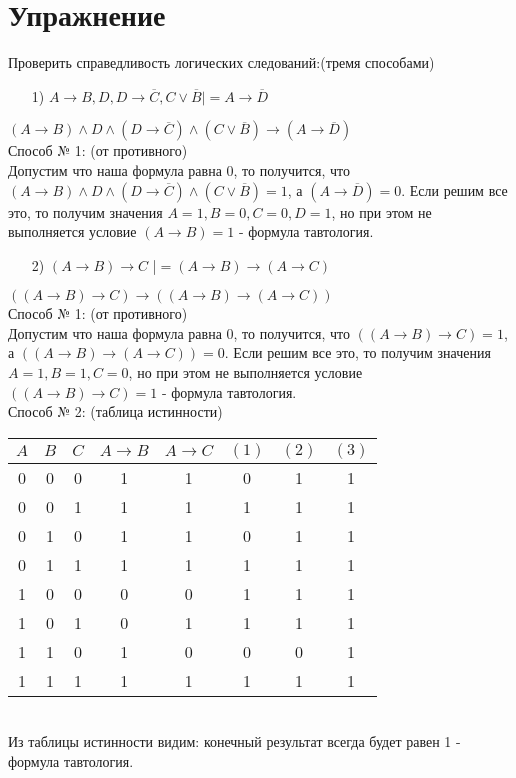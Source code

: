 \documentclass{article}
\begin{document}
\section{Упражнение}
Проверить справедливость логических следований:(тремя способами)
\begin{enumerate}
\item[1)] $A \rightarrow B,D , D \rightarrow \overline{C},C \vee \overline{B} |= A \rightarrow \overline{D}$
\end{enumerate}
$(A \rightarrow B) \wedge D \wedge (D \rightarrow \overline{C}) \wedge (C \vee \overline{B}) \rightarrow (A \rightarrow \overline{D})$\\
Способ № 1: (от противного)\\
Допустим что наша формула равна 0, то получится, что $(A \rightarrow B) \wedge D \wedge (D \rightarrow \overline{C}) \wedge (C \vee \overline{B}) = 1$, а $(A \rightarrow \overline{D}) = 0$. Если решим все это, то получим значения $A = 1, B = 0, C = 0, D = 1$, но при этом не выполняется условие $(A \rightarrow B) = 1$ - формула тавтология.\\

\begin{enumerate}
\item[2)] $(A \rightarrow B) \rightarrow C$ |$=(A \rightarrow B) \rightarrow (A \rightarrow C)$
\end{enumerate}
$((A \rightarrow B) \rightarrow C) \rightarrow ((A \rightarrow B) \rightarrow (A \rightarrow C))$\\
Способ № 1: (от противного)\\
Допустим что наша формула равна 0, то получится, что $((A \rightarrow B) \rightarrow C) = 1$, а $((A \rightarrow B) \rightarrow (A \rightarrow C)) = 0$. Если решим все это, то получим значения $A = 1, B = 1, C = 0$, но при этом не выполняется условие $((A \rightarrow B) \rightarrow C) = 1$ - формула тавтология.\\
Способ № 2: (таблица истинности)\\
\begin{tabular}{ | c | c | c | c | c | c | c| c | } %
$A$ & $B$ & $C$ & $A \rightarrow B$ & $A \rightarrow C$ & $(1)$ & $(2)$ & $(3)$\\ \hline
0 & 0 & 0 & 1 & 1 & 0 & 1 & 1\\
0 & 0 & 1 & 1 & 1 & 1 & 1 & 1\\
0 & 1 & 0 & 1 & 1 & 0 & 1 & 1\\
0 & 1 & 1 & 1 & 1 & 1 & 1 & 1\\
1 & 0 & 0 & 0 & 0 & 1 & 1 & 1\\
1 & 0 & 1 & 0 & 1 & 1 & 1 & 1\\
1 & 1 & 0 & 1 & 0 & 0 & 0 & 1\\
1 & 1 & 1 & 1 & 1 & 1 & 1 & 1\\
\hline
\end{tabular} \\
Из таблицы истинности видим: конечный результат всегда будет равен 1 - формула тавтология.
\end{document}
